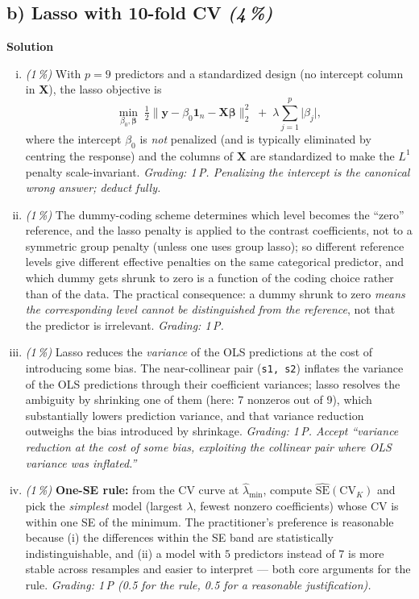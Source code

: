 \documentclass[11pt,a4paper]{article}
\newcommand{\subpoints}[1]{\textit{(#1\,\%)}}
\newcommand{\sol}{\noindent\textbf{Solution}}
\begin{document}
\subsection*{b) Lasso with 10-fold CV \subpoints{4}}
\sol{}
\begin{enumerate}[(i)]
  \item \subpoints{1} With $p = 9$ predictors and a standardized design (no intercept column in
        $\mathbf{X}$), the lasso objective is
        $$\min_{\beta_0, \boldsymbol\beta} \;\tfrac{1}{2}\bigl\|\mathbf{y} - \beta_0 \mathbf{1}_n - \mathbf{X}\boldsymbol\beta\bigr\|_2^2
          \;+\; \lambda \sum_{j=1}^{p} \lvert \beta_j \rvert,$$
        where the intercept $\beta_0$ is \emph{not} penalized (and is typically eliminated by
        centring the response) and the columns of $\mathbf{X}$ are standardized to make the
        $L^1$ penalty scale-invariant.
        \emph{Grading: 1\,P. Penalizing the intercept is the canonical wrong answer; deduct fully.}

  \item \subpoints{1} The dummy-coding scheme determines which level becomes the ``zero''
        reference, and the lasso penalty is applied to the contrast coefficients, not to a
        symmetric group penalty (unless one uses group lasso); so different reference levels
        give different effective penalties on the same categorical predictor, and which dummy
        gets shrunk to zero is a function of the coding choice rather than of the data. The
        practical consequence: a dummy shrunk to zero \emph{means the corresponding level
        cannot be distinguished from the reference}, not that the predictor is irrelevant.
        \emph{Grading: 1\,P.}

  \item \subpoints{1} Lasso reduces the \emph{variance} of the OLS predictions at the cost of
        introducing some bias. The near-collinear pair (\texttt{s1, s2}) inflates the variance
        of the OLS predictions through their coefficient variances; lasso resolves the
        ambiguity by shrinking one of them (here: 7 nonzeros out of 9), which substantially
        lowers prediction variance, and that variance reduction outweighs the bias introduced
        by shrinkage.
        \emph{Grading: 1\,P. Accept ``variance reduction at the cost of some bias, exploiting
        the collinear pair where OLS variance was inflated.''}

  \item \subpoints{1} \textbf{One-SE rule:} from the CV curve at $\hat\lambda_{\min}$, compute
        $\widehat{\mathrm{SE}}(\mathrm{CV}_K)$ and pick the \emph{simplest} model (largest
        $\lambda$, fewest nonzero coefficients) whose CV is within one SE of the minimum.
        The practitioner's preference is reasonable because (i) the differences within the SE
        band are statistically indistinguishable, and (ii) a model with $5$ predictors instead
        of $7$ is more stable across resamples and easier to interpret --- both core arguments
        for the rule.
        \emph{Grading: 1\,P (0.5 for the rule, 0.5 for a reasonable justification).}
\end{enumerate}
\end{document}
